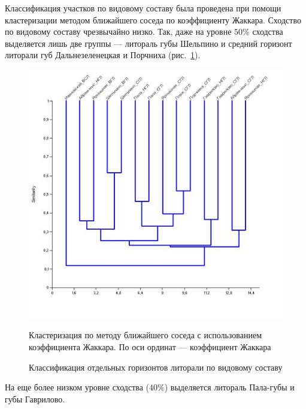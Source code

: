 Классификация участков по видовому составу была проведена при помощи кластеризации методом ближайшего соседа по коэффициенту Жаккара. 
Сходство по видовому составу чрезвычайно низко. 
Так, даже на уровне $50$\% сходства выделяется лишь две группы --- литораль губы Шельпино и средний горизонт литорали губ Дальнезеленецкая и Порчниха (рис.~\ref{ris:cluster_barents_species_tidal}). 
	\begin{figure}
		\begin{center}
			\includegraphics{../Barenc_Sea/soobshestvo/soobshestvo_po_gorizontam_Jakkard_paired_group_clusters.jpg}
		\end{center}
	\caption{Классификация отдельных горизонтов литорали по видовому составу}
	\label{ris:cluster_barents_species_tidal}

	\footnotesize{Кластеризация по методу ближайшего соседа с использованием коэффициента Жаккара. По оси ординат --- коэффициент Жаккара}
	\end{figure}
На еще более низком уровне сходства ($40$\%) выделяется литораль Пала-губы и губы Гаврилово. 

